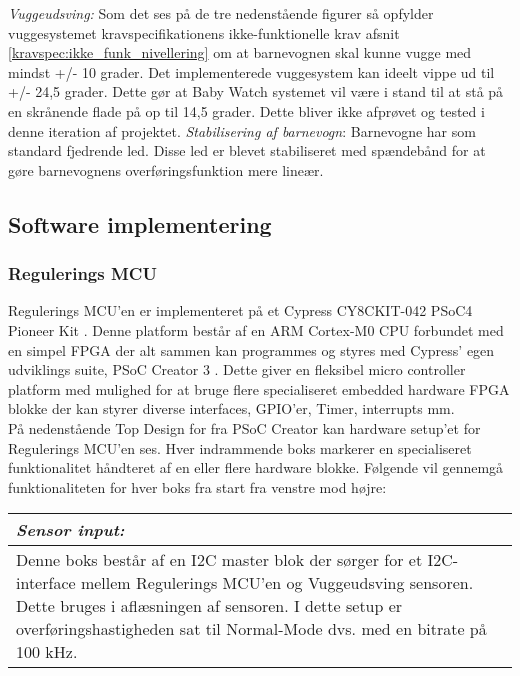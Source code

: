 \textit{Vuggeudsving:}
Som det ses på de tre nedenstående figurer så opfylder vuggesystemet kravspecifikationens ikke-funktionelle krav afsnit \ref{kravspec:ikke_funk_nivellering} om at barnevognen skal kunne vugge med mindst +/- 10 grader. Det implementerede vuggesystem  kan ideelt vippe ud til +/- 24,5 grader. Dette gør at Baby Watch systemet vil være i stand til at stå på en skrånende flade på op til 14,5 grader. Dette bliver ikke afprøvet og tested i denne iteration af projektet. 
\textit{Stabilisering af barnevogn}:
Barnevogne har som standard fjedrende led. Disse led er blevet stabiliseret med spændebånd for at gøre barnevognens overføringsfunktion mere lineær. 

\newpage
\subsection{Software implementering}
\subsubsection{Regulerings MCU} \label{Vuggesystem: R_MCU} 
Regulerings MCU'en er implementeret på et Cypress CY8CKIT-042 PSoC4 Pioneer Kit \citep{website:Cypress}. Denne platform består af en ARM Cortex-M0 CPU forbundet med en simpel FPGA der alt sammen kan programmes og styres med Cypress' egen udviklings suite, PSoC Creator 3 \citep{website:PSoC_Creator}. Dette giver en fleksibel micro controller platform med mulighed for at bruge flere specialiseret embedded hardware FPGA blokke der kan styrer diverse interfaces, GPIO'er, Timer, interrupts mm. \\
På nedenstående Top Design for fra PSoC Creator kan hardware setup'et for Regulerings MCU'en ses. Hver indrammende boks markerer en specialiseret funktionalitet håndteret af en eller flere hardware blokke.
Følgende vil gennemgå funktionaliteten for hver boks fra start fra venstre mod højre:
\begin{center}
    \begin{tabular}{| p{14.5cm} |}
    \hline
    \textit{Sensor input:} \\ \hline
    Denne boks består af en I2C master blok der sørger for et I2C-interface mellem Regulerings MCU'en og Vuggeudsving sensoren. Dette bruges i aflæsningen af sensoren. I dette setup er overføringshastigheden sat til Normal-Mode dvs. med en bitrate på 100 kHz. \\ \hline
    \end{tabular}
\end{center}

